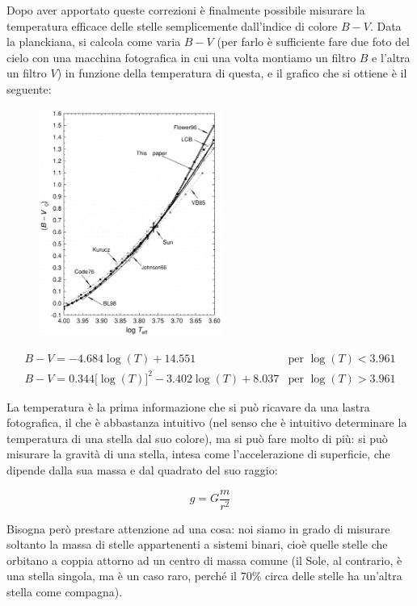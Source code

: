 Dopo aver apportato queste correzioni è finalmente possibile misurare la temperatura efficace delle stelle semplicemente dall'indice di colore $B-V$. Data la planckiana, si calcola come varia $B-V$ (per farlo è sufficiente fare due foto del cielo con una macchina fotografica in cui una volta montiamo un filtro $B$ e l'altra un filtro $V$) in funzione della temperatura di questa, e il grafico che si ottiene è il seguente:

\begin{figure}[H]
   \centering
   \includegraphics[width=6cm]{immagini/BV_vs_Teff.png}
\end{figure}

\vspace{-0.4cm}

$$\begin{array}{ll}
   B-V=-4.684 \log(T) + 14.551 & \text{per } \log(T) < 3.961\\
   B-V=0.344\big[ \log(T) \big]^2 - 3.402 \log(T) + 8.037 & \text{per } \log(T) > 3.961
\end{array}$$

La temperatura è la prima informazione che si può ricavare da una lastra fotografica, il che è abbastanza intuitivo (nel senso che è intuitivo determinare la temperatura di una stella dal suo colore), ma si può fare molto di più: si può misurare la gravità di una stella, intesa come l'accelerazione di superficie, che dipende dalla sua massa e dal quadrato del suo raggio:

$$g=G\frac{m}{r^2}$$

Bisogna però prestare attenzione ad una cosa: noi siamo in grado di misurare soltanto la massa di stelle appartenenti a sistemi binari, cioè quelle stelle che orbitano a coppia attorno ad un centro di massa comune (il Sole, al contrario, è una stella singola, ma è un caso raro, perché il 70\% circa delle stelle ha un'altra stella come compagna).

